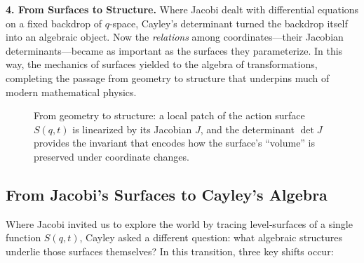 \textbf{4. From Surfaces to Structure.}  
Where Jacobi dealt with differential equations on a fixed backdrop of \(q\)-space, Cayley’s determinant turned the backdrop itself into an algebraic object.  Now the \emph{relations} among coordinates—their Jacobian determinants—became as important as the surfaces they parameterize.  In this way, the mechanics of surfaces yielded to the algebra of transformations, completing the passage from geometry to structure that underpins much of modern mathematical physics.  


\begin{figure}[H]
    \centering
    \caption{From geometry to structure: a local patch of the action surface \(S(q,t)\) is linearized by its Jacobian \(J\), and the determinant \(\det J\) provides the invariant that encodes how the surface’s “volume” is preserved under coordinate changes.}
\end{figure}
    






\subsection{From Jacobi’s Surfaces to Cayley’s Algebra}

Where Jacobi invited us to explore the world by tracing level‐surfaces of a single function \(S(q,t)\), Cayley asked a different question: what algebraic structures underlie those surfaces themselves?  In this transition, three key shifts occur:

